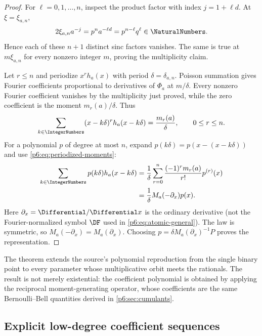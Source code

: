 \documentclass[11pt,oneside]{article}
\numberwithin{equation}{section}
\theoremstyle{definition}
\theoremstyle{remark}
\begin{document}
\begin{proof}
For $\ell=0,1,\ldots,n$, inspect the product factor with index
$j=1+\ell d$.  At $\xi=\xi_{a,n}$,
\[
 2\xi_{a,n}a^{-j}
 =p^na^{-\ell d}
 =p^{n-\ell}q^\ell\in\NaturalNumbers.
\]
Hence each of these $n+1$ distinct sinc factors vanishes.  The same is true at
$m\xi_{a,n}$ for every nonzero integer $m$, proving the multiplicity claim.

Let $r\le n$ and periodize $x^rh_a(x)$ with period $\delta=\delta_{a,n}$.
Poisson summation gives Fourier coefficients proportional to derivatives of
$\Phi_a$ at $m/\delta$.  Every nonzero Fourier coefficient vanishes by the
multiplicity just proved, while the zero coefficient is the moment
$m_r(a)/\delta$.  Thus
\begin{equation}\label{p6:eq:periodized-moments}
 \sum_{k\in\IntegerNumbers}(x-k\delta)^r h_a(x-k\delta)
 =\frac{m_r(a)}{\delta},
 \qquad 0\le r\le n.
\end{equation}
For a polynomial $p$ of degree at most $n$, expand
$p(k\delta)=p(x-(x-k\delta))$ and use
\eqref{p6:eq:periodized-moments}:
\begin{align*}
 \sum_{k\in\IntegerNumbers}p(k\delta)h_a(x-k\delta)
 &=\frac1\delta
 \sum_{r=0}^{n}\frac{(-1)^rm_r(a)}{r!}p^{(r)}(x)\\
 &=\frac1\delta M_a(-\partial_x)p(x).
\end{align*}
Here $\partial_x=\Differential/\Differential x$ is the ordinary derivative (not the
Fourier-normalized symbol $\DF$ used in \cref{p6:eq:atomic-general}).  The law is
symmetric, so $M_a(-\partial_x)=M_a(\partial_x)$.  Choosing
$p=\delta M_a(\partial_x)^{-1}P$ proves the representation.
\end{proof}

\begin{novelbox}
The theorem extends the source's polynomial reproduction from the single binary
point to every parameter whose multiplicative orbit meets the rationals.  The
result is not merely existential: the coefficient polynomial is obtained by
applying the reciprocal moment-generating operator, whose coefficients are the
same Bernoulli--Bell quantities derived in \cref{p6:sec:cumulants}.
\end{novelbox}

\subsection{Explicit low-degree coefficient sequences}
\end{document}
